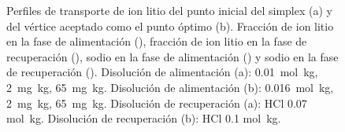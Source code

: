 \begin{figure}[H]
    \centering
    \caption[Perfiles de transporte de ion litio del sistema bajo optimización.]{Perfiles de transporte de ion litio del punto inicial del simplex (a) y del vértice aceptado como el punto óptimo (b). Fracción de ion litio en la fase de alimentación (\protect\squareblck), fracción de ion litio en la fase de recuperación (\protect\squarewht), sodio en la fase de alimentación (\protect\triangleupblck) y sodio en la fase de recuperación (\protect\triangleupwht). Disolución de alimentación (a):  0.01~mol~kg\mnn,  2~mg~kg\mnn,  65~mg~kg\mnn. Disolución de alimentación (b):  0.016~mol~kg\mnn,  2~mg~kg\mnn,  65~mg~kg\mnn. Disolución de recuperación (a): HCl 0.07 mol~kg\mnn. Disolución de recuperación (b): HCl 0.1 mol~kg\mnn.}
    \label{fig:simplex2.profiles}
\end{figure}
